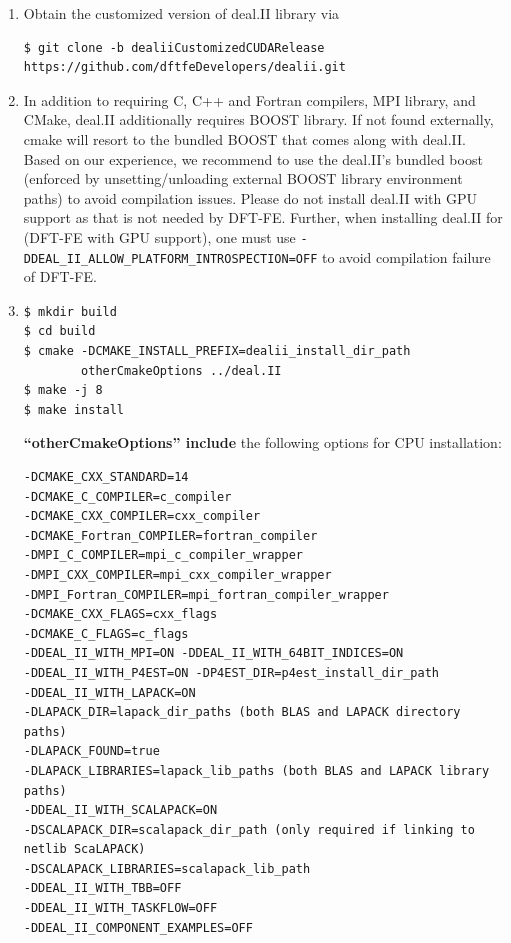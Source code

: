 \begin{enumerate}

\item Obtain the customized version of deal.II library via
\begin{verbatim}
$ git clone -b dealiiCustomizedCUDARelease https://github.com/dftfeDevelopers/dealii.git
\end{verbatim}

\item In addition to requiring C, C++ and Fortran compilers, MPI library, and CMake, deal.II additionally requires BOOST library. If not found externally, cmake will resort to the bundled BOOST that comes along with deal.II. Based on our experience, we recommend to use the deal.II's bundled boost (enforced by unsetting/unloading external BOOST library environment paths) to avoid compilation issues. Please do not install deal.II with GPU support as that is not needed by DFT-FE. Further, when installing deal.II for (DFT-FE with GPU support), one must use \verb|-DDEAL_II_ALLOW_PLATFORM_INTROSPECTION=OFF| to avoid compilation failure of DFT-FE.

\item
\begin{verbatim}
$ mkdir build
$ cd build
$ cmake -DCMAKE_INSTALL_PREFIX=dealii_install_dir_path
        otherCmakeOptions ../deal.II
$ make -j 8        
$ make install
\end{verbatim}
{\bf ``otherCmakeOptions'' include} the following options for CPU installation:
\begin{verbatim}
-DCMAKE_CXX_STANDARD=14
-DCMAKE_C_COMPILER=c_compiler
-DCMAKE_CXX_COMPILER=cxx_compiler
-DCMAKE_Fortran_COMPILER=fortran_compiler
-DMPI_C_COMPILER=mpi_c_compiler_wrapper
-DMPI_CXX_COMPILER=mpi_cxx_compiler_wrapper
-DMPI_Fortran_COMPILER=mpi_fortran_compiler_wrapper
-DCMAKE_CXX_FLAGS=cxx_flags
-DCMAKE_C_FLAGS=c_flags
-DDEAL_II_WITH_MPI=ON -DDEAL_II_WITH_64BIT_INDICES=ON
-DDEAL_II_WITH_P4EST=ON -DP4EST_DIR=p4est_install_dir_path
-DDEAL_II_WITH_LAPACK=ON
-DLAPACK_DIR=lapack_dir_paths (both BLAS and LAPACK directory paths)
-DLAPACK_FOUND=true
-DLAPACK_LIBRARIES=lapack_lib_paths (both BLAS and LAPACK library paths)
-DDEAL_II_WITH_SCALAPACK=ON
-DSCALAPACK_DIR=scalapack_dir_path (only required if linking to netlib ScaLAPACK)
-DSCALAPACK_LIBRARIES=scalapack_lib_path
-DDEAL_II_WITH_TBB=OFF
-DDEAL_II_WITH_TASKFLOW=OFF
-DDEAL_II_COMPONENT_EXAMPLES=OFF
\end{verbatim}



\end{enumerate}	
